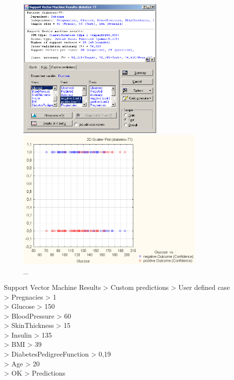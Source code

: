 \begin{figure}[!h]
  \centering

  \begin{minipage}{0.49\textwidth}
    \centering

    \includegraphics[height=7cm]
    {inc/v5_19.PNG}

    \caption{\_}

    \label{fig:v5_19}
  \end{minipage}
  \begin{minipage}{0.49\textwidth}
    \centering

    \includegraphics[height=7cm]
    {inc/v5_20.PNG}

    \caption{\_}

    \label{fig:v5_20}
  \end{minipage}
\end{figure}

Support Vector Machine Results > Custom predictions > User defined case \\
> Pregnacies > 1 \\
> Glucose > 150 \\
> BloodPressure > 60 \\
> SkinThickness > 15 \\
> Insulin > 135 \\
> BMI > 39 \\
> DiabetesPedigreeFunction > 0,19 \\
> Age > 20 \\
> OK > Predictions


